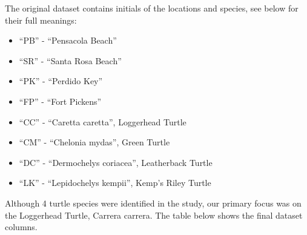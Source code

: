 \documentclass[
  letterpaper,
  DIV=11,
  numbers=noendperiod]{scrartcl}
\providecommand{\tightlist}{%
  \setlength{\itemsep}{0pt}\setlength{\parskip}{0pt}}\usepackage{longtable,booktabs,array}
\begin{document}
The original dataset contains initials of the locations and species, see
below for their full meanings:

\begin{itemize}
\tightlist
\item
  ``PB'' - ``Pensacola Beach''
\item
  ``SR'' - ``Santa Rosa Beach''
\item
  ``PK'' - ``Perdido Key''
\item
  ``FP'' - ``Fort Pickens''
\item
  ``CC'' - ``Caretta caretta'', Loggerhead Turtle
\item
  ``CM'' - ``Chelonia mydas'', Green Turtle
\item
  ``DC'' - ``Dermochelys coriacea'', Leatherback Turtle
\item
  ``LK'' - ``Lepidochelys kempii'', Kemp's Riley Turtle
\end{itemize}

Although 4 turtle species were identified in the study, our primary
focus was on the Loggerhead Turtle, Carrera carrera. The table below
shows the final dataset columns.

\begin{table}

\caption{\label{tbl-CCdata-table}Data Table (with Surface Water
Temperature) of the Nesting Habits of Loggerhead Turtles: 1988-2020
(Partial)}


\end{table}%
\end{document}
